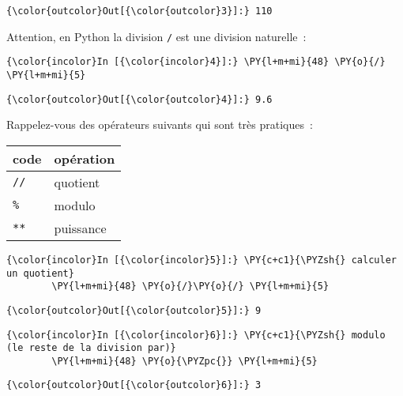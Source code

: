 \begin{Verbatim}[commandchars=\\\{\}]
{\color{outcolor}Out[{\color{outcolor}3}]:} 110
\end{Verbatim}
            
    Attention, en Python la division \texttt{/} est une division naturelle~:

    \begin{Verbatim}[commandchars=\\\{\}]
{\color{incolor}In [{\color{incolor}4}]:} \PY{l+m+mi}{48} \PY{o}{/} \PY{l+m+mi}{5}
\end{Verbatim}


\begin{Verbatim}[commandchars=\\\{\}]
{\color{outcolor}Out[{\color{outcolor}4}]:} 9.6
\end{Verbatim}
            
    Rappelez-vous des opérateurs suivants qui sont très pratiques~:

\begin{longtable}[]{@{}ll@{}}
\toprule
code & opération\tabularnewline
\midrule
\endhead
\texttt{//} & quotient\tabularnewline
\texttt{\%} & modulo\tabularnewline
\texttt{**} & puissance\tabularnewline
\bottomrule
\end{longtable}

    \begin{Verbatim}[commandchars=\\\{\}]
{\color{incolor}In [{\color{incolor}5}]:} \PY{c+c1}{\PYZsh{} calculer un quotient}
        \PY{l+m+mi}{48} \PY{o}{/}\PY{o}{/} \PY{l+m+mi}{5}
\end{Verbatim}


\begin{Verbatim}[commandchars=\\\{\}]
{\color{outcolor}Out[{\color{outcolor}5}]:} 9
\end{Verbatim}
            
    \begin{Verbatim}[commandchars=\\\{\}]
{\color{incolor}In [{\color{incolor}6}]:} \PY{c+c1}{\PYZsh{} modulo (le reste de la division par)}
        \PY{l+m+mi}{48} \PY{o}{\PYZpc{}} \PY{l+m+mi}{5}
\end{Verbatim}


\begin{Verbatim}[commandchars=\\\{\}]
{\color{outcolor}Out[{\color{outcolor}6}]:} 3
\end{Verbatim}
            
